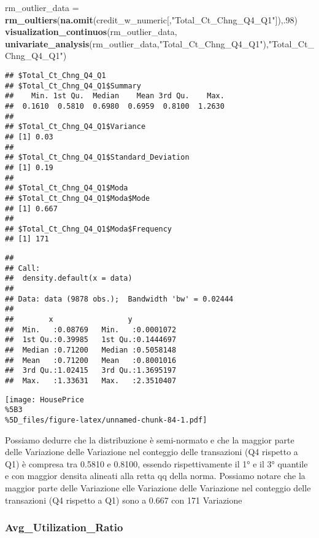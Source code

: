 \documentclass[
]{article}
\newenvironment{Shaded}{\begin{snugshade}}{\end{snugshade}}
\newcommand{\DecValTok}[1]{\textcolor[rgb]{0.00,0.00,0.81}{#1}}
\newcommand{\FunctionTok}[1]{\textcolor[rgb]{0.13,0.29,0.53}{\textbf{#1}}}
\newcommand{\NormalTok}[1]{#1}
\newcommand{\OtherTok}[1]{\textcolor[rgb]{0.56,0.35,0.01}{#1}}
\newcommand{\StringTok}[1]{\textcolor[rgb]{0.31,0.60,0.02}{#1}}
\begin{document}
\begin{Shaded}
\begin{Highlighting}[]
\NormalTok{rm\_outlier\_data }\OtherTok{=} \FunctionTok{rm\_oultiers}\NormalTok{(}\FunctionTok{na.omit}\NormalTok{(credit\_w\_numeric[,}\StringTok{"Total\_Ct\_Chng\_Q4\_Q1"}\NormalTok{]),.}\DecValTok{98}\NormalTok{)}
\FunctionTok{visualization\_continuos}\NormalTok{(rm\_outlier\_data, }\FunctionTok{univariate\_analysis}\NormalTok{(rm\_outlier\_data,}\StringTok{"Total\_Ct\_Chng\_Q4\_Q1"}\NormalTok{),}\StringTok{"Total\_Ct\_Chng\_Q4\_Q1"}\NormalTok{)}
\end{Highlighting}
\end{Shaded}

\begin{verbatim}
## $Total_Ct_Chng_Q4_Q1
## $Total_Ct_Chng_Q4_Q1$Summary
##    Min. 1st Qu.  Median    Mean 3rd Qu.    Max. 
##  0.1610  0.5810  0.6980  0.6959  0.8100  1.2630 
## 
## $Total_Ct_Chng_Q4_Q1$Variance
## [1] 0.03
## 
## $Total_Ct_Chng_Q4_Q1$Standard_Deviation
## [1] 0.19
## 
## $Total_Ct_Chng_Q4_Q1$Moda
## $Total_Ct_Chng_Q4_Q1$Moda$Mode
## [1] 0.667
## 
## $Total_Ct_Chng_Q4_Q1$Moda$Frequency
## [1] 171
\end{verbatim}

\begin{verbatim}
## 
## Call:
##  density.default(x = data)
## 
## Data: data (9878 obs.);  Bandwidth 'bw' = 0.02444
## 
##        x                 y            
##  Min.   :0.08769   Min.   :0.0001072  
##  1st Qu.:0.39985   1st Qu.:0.1444697  
##  Median :0.71200   Median :0.5058148  
##  Mean   :0.71200   Mean   :0.8001016  
##  3rd Qu.:1.02415   3rd Qu.:1.3695197  
##  Max.   :1.33631   Max.   :2.3510407
\end{verbatim}

\texttt{[image: HousePrice\\\%5B3\\\%5D\_files/figure-latex/unnamed-chunk-84-1.pdf]}

Possiamo dedurre che la distribuzione è semi-normato e che la maggior
parte delle Variazione delle Variazione nel conteggio delle transazioni
(Q4 rispetto a Q1) è compresa tra 0.5810 e 0.8100, essendo
rispettivamente il 1° e il 3° quantile e con maggior densita alineati
alla retta qq della norma. Possiamo notare che la maggior parte delle
Variazione elle Variazione delle Variazione nel conteggio delle
transazioni (Q4 rispetto a Q1) sono a 0.667 con 171 Variazione

\subsubsection{Avg\_Utilization\_Ratio}\label{avg_utilization_ratio}
\end{document}
